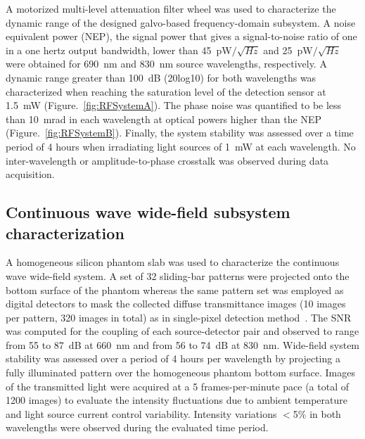 A motorized multi-level attenuation filter wheel was used to characterize the dynamic range of the designed galvo-based frequency-domain subsystem. A noise equivalent power (NEP), the signal power that gives a signal-to-noise ratio of one in a one hertz output bandwidth, lower than 45~pW$/\sqrt{Hz}$ and 25~pW$/\sqrt{Hz}$ were obtained for 690~nm and 830~nm source wavelengths, respectively. A dynamic range greater than 100~dB (20log10) for both wavelengths was characterized when reaching the saturation level of the detection sensor at 1.5~mW (Figure.~\ref{fig:RFSystemA}). The phase noise was quantified to be less than 10~mrad in each wavelength at optical powers higher than the NEP (Figure.~\ref{fig:RFSystemB}). Finally, the system stability was assessed over a time period of 4 hours when irradiating light sources of 1~mW at each wavelength. No inter-wavelength or amplitude-to-phase crosstalk was observed during data acquisition.


\subsection{Continuous wave wide-field subsystem characterization}
A homogeneous silicon phantom slab was used to characterize the continuous wave wide-field system. A set of 32 sliding-bar patterns were projected onto the bottom surface of the phantom whereas the same pattern set was employed as digital detectors to mask the collected diffuse transmittance images (10 images per pattern, 320 images in total) as in single-pixel detection method~\cite{Pian2015}. The SNR was computed for the coupling of each source-detector pair and observed to range from 55 to 87~dB at 660~nm and from 56 to 74~dB at 830~nm. Wide-field system stability was assessed over a period of 4 hours per wavelength by projecting a fully illuminated pattern over the homogeneous phantom bottom surface. Images of the transmitted light were acquired at a 5 frames-per-minute pace (a total of 1200 images) to evaluate the intensity fluctuations due to ambient temperature and light source current control variability. Intensity variations $<$5\% in both wavelengths were observed during the evaluated time period.

